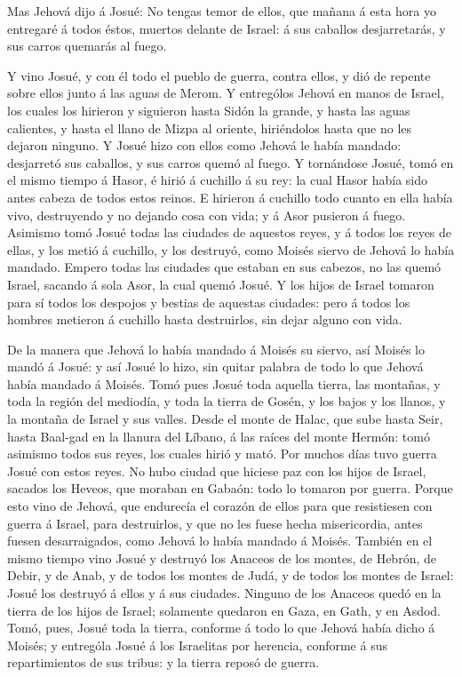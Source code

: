  Mas Jehová dijo á Josué: No tengas temor de ellos, que
mañana á esta hora yo entregaré á todos éstos, muertos delante de
Israel: á sus caballos desjarretarás, y sus carros quemarás al fuego.

 Y vino Josué, y con él todo el pueblo de guerra, contra
ellos, y dió de repente sobre ellos junto á las aguas de Merom.
 Y entrególos Jehová en manos de Israel, los cuales los
hirieron y siguieron hasta Sidón la grande, y hasta las aguas calientes,
y hasta el llano de Mizpa al oriente, hiriéndolos hasta que no les
dejaron ninguno.  Y Josué hizo con ellos como Jehová le
había mandado: desjarretó sus caballos, y sus carros quemó al fuego.
 Y tornándose Josué, tomó en el mismo tiempo á Hasor, é
hirió á cuchillo á su rey: la cual Hasor había sido antes cabeza de
todos estos reinos.  E hirieron á cuchillo todo cuanto en
ella había vivo, destruyendo y no dejando cosa con vida; y á Asor
pusieron á fuego.  Asimismo tomó Josué todas las ciudades
de aquestos reyes, y á todos los reyes de ellas, y los metió á cuchillo,
y los destruyó, como Moisés siervo de Jehová lo había mandado.
 Empero todas las ciudades que estaban en sus cabezos, no
las quemó Israel, sacando á sola Asor, la cual quemó Josué.
 Y los hijos de Israel tomaron para sí todos los despojos y
bestias de aquestas ciudades: pero á todos los hombres metieron á
cuchillo hasta destruirlos, sin dejar alguno con vida.

 De la manera que Jehová lo había mandado á Moisés su
siervo, así Moisés lo mandó á Josué: y así Josué lo hizo, sin quitar
palabra de todo lo que Jehová había mandado á Moisés.  Tomó
pues Josué toda aquella tierra, las montañas, y toda la región del
mediodía, y toda la tierra de Gosén, y los bajos y los llanos, y la
montaña de Israel y sus valles.  Desde el monte de Halac,
que sube hasta Seir, hasta Baal-gad en la llanura del Líbano, á las
raíces del monte Hermón: tomó asimismo todos sus reyes, los cuales hirió
y mató.  Por muchos días tuvo guerra Josué con estos reyes.
 No hubo ciudad que hiciese paz con los hijos de Israel,
sacados los Heveos, que moraban en Gabaón: todo lo tomaron por guerra.
 Porque esto vino de Jehová, que endurecía el corazón de
ellos para que resistiesen con guerra á Israel, para destruirlos, y que
no les fuese hecha misericordia, antes fuesen desarraigados, como Jehová
lo había mandado á Moisés.  También en el mismo tiempo vino
Josué y destruyó los Anaceos de los montes, de Hebrón, de Debir, y de
Anab, y de todos los montes de Judá, y de todos los montes de Israel:
Josué los destruyó á ellos y á sus ciudades.  Ninguno de
los Anaceos quedó en la tierra de los hijos de Israel; solamente
quedaron en Gaza, en Gath, y en Asdod.  Tomó, pues, Josué
toda la tierra, conforme á todo lo que Jehová había dicho á Moisés; y
entrególa Josué á los Israelitas por herencia, conforme á sus
repartimientos de sus tribus: y la tierra reposó de guerra.

